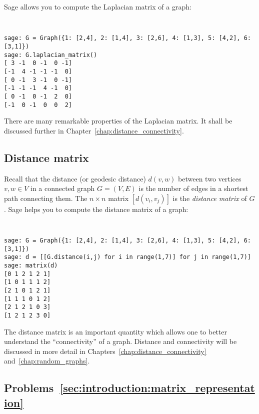 Sage allows you to compute the Laplacian matrix of a graph:
%
\begin{center}
\fontsize{9pt}{9pt}
\selectfont
\tt
\begin{lstlisting}
sage: G = Graph({1: [2,4], 2: [1,4], 3: [2,6], 4: [1,3], 5: [4,2], 6: [3,1]})
sage: G.laplacian_matrix()
[ 3 -1  0 -1  0 -1]
[-1  4 -1 -1 -1  0]
[ 0 -1  3 -1  0 -1]
[-1 -1 -1  4 -1  0]
[ 0 -1  0 -1  2  0]
[-1  0 -1  0  0  2]
\end{lstlisting}
\end{center}
%
There are many remarkable properties of the Laplacian matrix. It shall
be discussed further in Chapter~\ref{chap:distance_connectivity}.



\subsection{Distance matrix}

Recall that the distance (or geodesic distance) $d(v,w)$ between two
vertices $v,w \in V$ in a connected graph $G = (V,E)$ is the number of
edges in a shortest path connecting them. The $n \times n$ matrix
$[d(v_i, v_j)]$ is the \emph{distance matrix} of $G$.
Sage helps you to compute the distance matrix of a graph:
%
\begin{center}
\fontsize{9pt}{9pt}
\selectfont
\tt
\begin{lstlisting}
sage: G = Graph({1: [2,4], 2: [1,4], 3: [2,6], 4: [1,3], 5: [4,2], 6: [3,1]})
sage: d = [[G.distance(i,j) for i in range(1,7)] for j in range(1,7)]
sage: matrix(d)
[0 1 2 1 2 1]
[1 0 1 1 1 2]
[2 1 0 1 2 1]
[1 1 1 0 1 2]
[2 1 2 1 0 3]
[1 2 1 2 3 0]
\end{lstlisting}
\end{center}

The distance matrix is an important quantity which allows one to
better understand the ``connectivity'' of a graph. Distance and
connectivity will be discussed in more detail in
Chapters~\ref{chap:distance_connectivity}
and~\ref{chap:random_graphs}.



\subsection*{Problems~\ref{sec:introduction:matrix_representation}}

